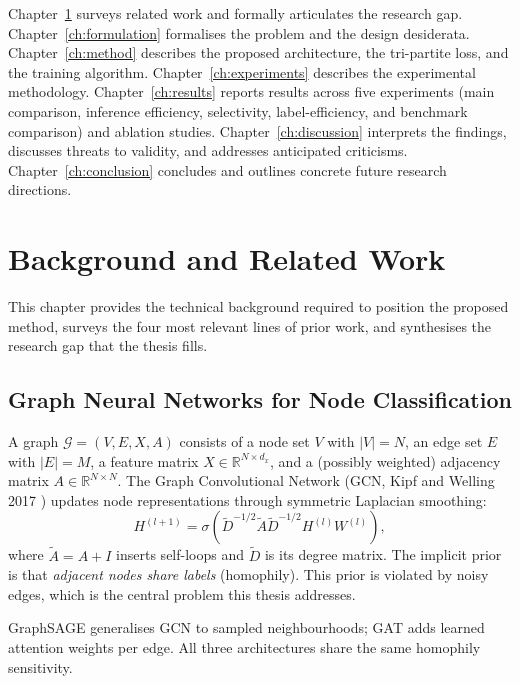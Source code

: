 \documentclass[11pt,a4paper]{report}
\theoremstyle{definition}
\theoremstyle{remark}
\begin{document}
Chapter~\ref{ch:related} surveys related work and formally articulates
the research gap. Chapter~\ref{ch:formulation} formalises the problem
and the design desiderata. Chapter~\ref{ch:method} describes the
proposed architecture, the tri-partite loss, and the training
algorithm. Chapter~\ref{ch:experiments} describes the experimental
methodology. Chapter~\ref{ch:results} reports results across five
experiments (main comparison, inference efficiency, selectivity,
label-efficiency, and benchmark comparison) and ablation studies.
Chapter~\ref{ch:discussion} interprets the findings, discusses threats
to validity, and addresses anticipated criticisms.
Chapter~\ref{ch:conclusion} concludes and outlines concrete future
research directions.

\chapter{Background and Related Work}
\label{ch:related}

This chapter provides the technical background required to position the
proposed method, surveys the four most relevant lines of prior work, and
synthesises the research gap that the thesis fills.

\section{Graph Neural Networks for Node Classification}

A graph $\mathcal{G}=(V,E,X,A)$ consists of a node set $V$ with
$|V|=N$, an edge set $E$ with $|E|=M$, a feature matrix
$X\in\mathbb{R}^{N\times d_x}$, and a (possibly weighted) adjacency
matrix $A\in\mathbb{R}^{N\times N}$. The Graph Convolutional Network
(GCN, Kipf and Welling 2017 \cite{kipf2017semi}) updates node
representations through symmetric Laplacian smoothing:
\begin{equation}
H^{(l+1)} = \sigma\!\left(\widetilde{D}^{-1/2}\widetilde{A}\widetilde{D}^{-1/2}H^{(l)}W^{(l)}\right),
\label{eq:gcn}
\end{equation}
where $\widetilde{A}=A+I$ inserts self-loops and $\widetilde{D}$ is its
degree matrix. The implicit prior is that \emph{adjacent nodes share
labels} (homophily). This prior is violated by noisy edges, which is
the central problem this thesis addresses.

GraphSAGE \cite{hamilton2017graphsage} generalises GCN to sampled
neighbourhoods; GAT \cite{velickovic2018gat} adds learned attention
weights per edge. All three architectures share the same homophily
sensitivity.
\end{document}
